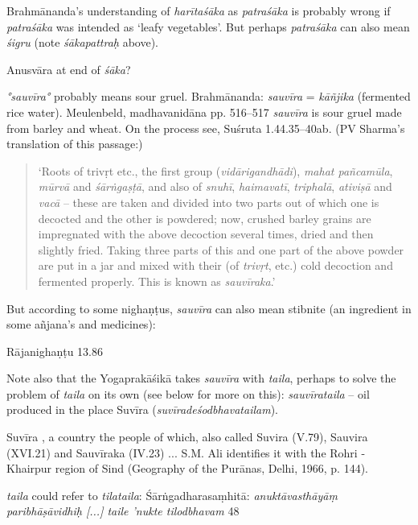 \begin{ekdosis}
\begin{philcomm}[hp01_059]
Brahmānanda’s understanding of \emph{harītaśāka} as \emph{patraśāka} is probably wrong if \emph{patraśāka} was intended as ‘leafy vegetables’. But perhaps \emph{patraśāka} can also mean \emph{śigru} (note \emph{śākapattraḥ} above).

Anusvāra at end of \emph{śāka}?

\emph{°sauvīra°} probably means sour gruel.
Brahmānanda: \emph{sauvīra} = \emph{kāñjika} (fermented rice water).
Meulenbeld, madhavanidāna pp. 516–517
\emph{sauvīra} is sour gruel made from barley and wheat. On the process see, Suśruta 1.44.35--40ab.
(PV Sharma’s translation of this passage:)

\begin{quote}
‘Roots of trivṛt etc., the first group (\emph{vidārigandhādi}), \emph{mahat pañcamūla}, \emph{mūrvā} and \emph{śārṅgaṣṭā}, and also of \emph{snuhī}, \emph{haimavatī}, \emph{triphalā}, \emph{ativiṣā} and \emph{vacā} -- these are taken and divided into two parts out of which one is decocted and the other is powdered; now, crushed barley grains are impregnated with the above decoction several times, dried and then slightly fried. Taking three parts of this and one part of the above powder are put in a jar and mixed with their (of \emph{trivṛt}, etc.) cold decoction and fermented properly. This is known as \emph{sauvīraka}.’
\end{quote}

But according to some nighaṇṭus, \emph{sauvīra} can also mean stibnite (an ingredient in some añjana’s and medicines):

Rājanighaṇṭu 13.86

\begin{versinnote}
\end{versinnote}

Note also that the Yogaprakāśikā takes \emph{sauvīra} with \emph{taila}, perhaps to solve the problem of \emph{taila} on its own (see below for more on this): \emph{sauvīrataila} -- oil produced in the place Suvīra (\emph{suvīradeśodbhavatailam}).

Suvīra , a country the people of which, also called Suvira (V.79), Sauvira (XVI.21) and Sauvīraka (IV.23) ... S.M. Ali identifies it with the Rohri - Khairpur region of Sind (Geography of the Purānas, Delhi, 1966, p. 144).

\emph{taila} could refer to \emph{tilataila}:
Śārṅgadharasaṃhitā:
\emph{anuktāvasthāyāṃ paribhāṣāvidhiḥ [...] taile ’nukte tilodbhavam} 48


\end{philcomm}
\end{ekdosis}
